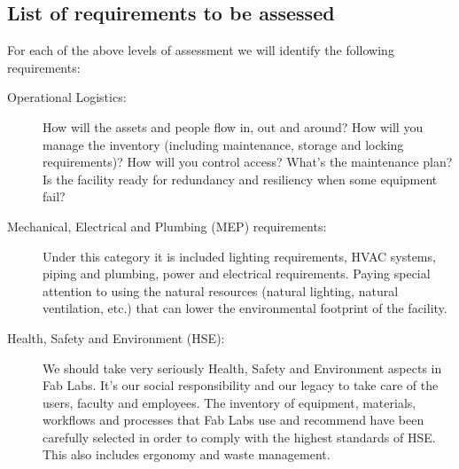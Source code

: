\documentclass[a4paper,12pt,titlepage]{article}
\begin{document}
\subsection{List of requirements to be assessed}
For each of the above levels of assessment we will identify the following requirements:
\begin{description}
\item [Operational Logistics:] How will the assets and people flow in, out and around? How will you manage the inventory (including maintenance, storage and locking requirements)? How will you control access? What's the maintenance plan? Is the facility ready for redundancy and resiliency when some equipment fail?

\item [Mechanical, Electrical and Plumbing (MEP) requirements:] Under this category it is included lighting requirements, HVAC systems, piping and plumbing, power and electrical requirements. Paying special attention to using the natural resources (natural lighting, natural ventilation, etc.) that can lower the environmental footprint of the facility.

\item [Health, Safety and Environment (HSE):] We should take very seriously Health, Safety and Environment aspects in Fab Labs. It's our social responsibility and our legacy to take care of the users, faculty and employees.
The inventory of equipment, materials, workflows and processes that Fab Labs use and recommend have been
carefully selected in order to comply with the highest standards of HSE. This also includes ergonomy and waste management.
\end{description}
\end{document}
